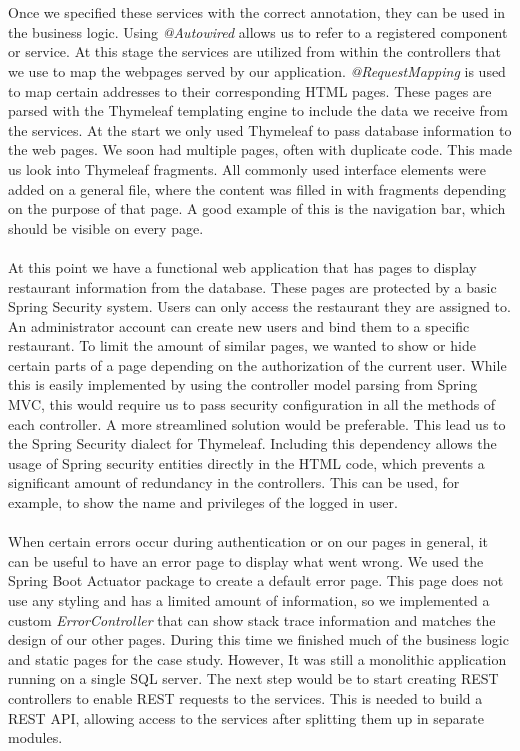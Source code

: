 \documentclass[12pt]{article}
\begin{document}
\begin{multicols}{2}
\\\\
Once we specified these services with the correct annotation, they can be used in the business logic. Using \textit{@Autowired} allows us to refer to a registered component or service. At this stage the services are utilized from within the controllers that we use to map the webpages served by our application. \textit{@RequestMapping} is used to map certain addresses to their corresponding HTML pages. These pages are parsed with the Thymeleaf templating engine to include the data we receive from the services. At the start we only used Thymeleaf to pass database information to the web pages. We soon had multiple pages, often with duplicate code. This made us look into Thymeleaf fragments. All commonly used interface elements were added on a general file, where the content was filled in with fragments depending on the purpose of that page. A good example of this is the navigation bar, which should be visible on every page.
\\\\
At this point we have a functional web application that has pages to display restaurant information from the database. These pages are protected by a basic Spring Security system. Users can only access the restaurant they are assigned to. An administrator account can create new users and bind them to a specific restaurant. To limit the amount of similar pages, we wanted to show or hide certain parts of a page depending on the authorization of the current user. While this is easily implemented by using the controller model parsing from Spring MVC, this would require us to pass security configuration in all the methods of each controller. A more streamlined solution would be preferable. This lead us to the Spring Security dialect for Thymeleaf. Including this dependency allows the usage of Spring security entities directly in the HTML code, which prevents a significant amount of redundancy in the controllers. This can be used, for example, to show the name and privileges of the logged in user.
\\\\
When certain errors occur during authentication or on our pages in general, it can be useful to have an error page to display what went wrong. We used the Spring Boot Actuator package to create a default error page. This page does not use any styling and has a limited amount of information, so we implemented a custom \textit{ErrorController} that can show stack trace information and matches the design of our other pages. During this time we finished much of the business logic and static pages for the case study. However, It was still a monolithic application running on a single SQL server. The next step would be to start creating REST controllers to enable REST requests to the services. This is needed to build a REST API, allowing access to the services after splitting them up in separate modules.

\end{multicols}
\end{document}
